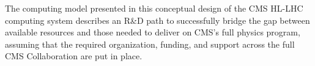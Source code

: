 The computing model presented in this conceptual design of the CMS \gls{HL-LHC} computing system describes an R\&D path to successfully bridge the gap between available resources and those needed to deliver on CMS’s full physics program, assuming that the required organization, funding, and support across the full CMS Collaboration are put in place.

\clearpage

\printglossary[type=\acronymtype,title=Glossary of special terms and acronyms,toctitle=Glossary of special terms and acronyms]
\label{Glossary}

\clearpage

\label{References}



% 
